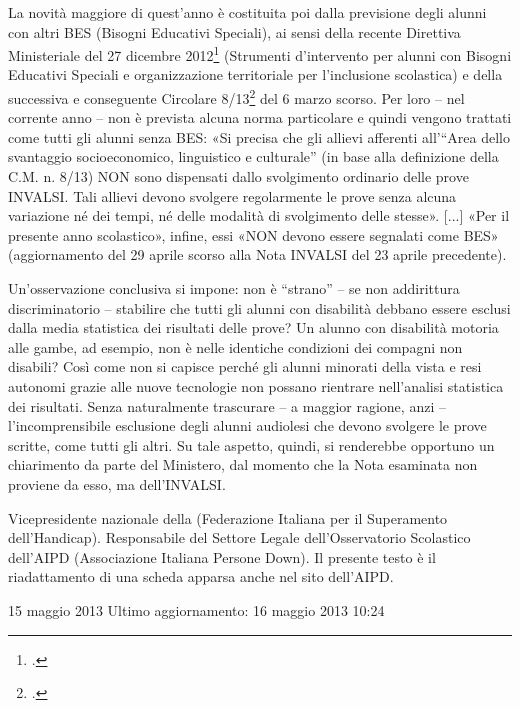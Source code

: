 La novità maggiore di quest'anno è costituita poi dalla previsione degli alunni con altri BES (Bisogni Educativi Speciali), ai sensi della recente Direttiva Ministeriale del 27 dicembre 2012\footcite{dir27Dic2012} (Strumenti d'intervento per alunni con Bisogni Educativi Speciali e organizzazione territoriale per l'inclusione scolastica) e della successiva e conseguente Circolare 8/13\footcite{cm8_2013} del 6 marzo scorso. Per loro – nel corrente anno – non è prevista alcuna norma particolare e quindi vengono trattati come tutti gli alunni senza BES: «Si precisa che gli allievi afferenti all'“Area dello svantaggio socioeconomico, linguistico e culturale” (in base alla definizione della C.M. n. 8/13) NON sono dispensati dallo svolgimento ordinario delle prove INVALSI. Tali allievi devono svolgere regolarmente le prove senza alcuna variazione né dei tempi, né delle modalità di svolgimento delle stesse». [...] «Per il presente anno scolastico», infine, essi «NON devono essere segnalati come BES» (aggiornamento del 29 aprile scorso alla Nota INVALSI del 23 aprile precedente).

Un'osservazione conclusiva si impone: non è “strano” – se non addirittura discriminatorio – stabilire che tutti gli alunni con disabilità debbano essere esclusi dalla media statistica dei risultati delle prove? Un alunno con disabilità motoria alle gambe, ad esempio, non è nelle identiche condizioni dei compagni non disabili? Così come non si capisce perché gli alunni minorati della vista e resi autonomi grazie alle nuove tecnologie non possano rientrare nell'analisi statistica dei risultati. Senza naturalmente trascurare – a maggior ragione, anzi – l'incomprensibile esclusione degli alunni audiolesi che devono svolgere le prove scritte, come tutti gli altri.
Su tale aspetto, quindi, si renderebbe opportuno un chiarimento da parte del Ministero, dal momento che la Nota esaminata non proviene da esso, ma dell'INVALSI.

Vicepresidente nazionale della   (Federazione Italiana per il Superamento dell'Handicap). Responsabile del Settore Legale dell'Osservatorio Scolastico dell'AIPD (Associazione Italiana Persone Down). Il presente testo è il riadattamento di una scheda apparsa anche nel sito dell’AIPD.

15 maggio 2013
Ultimo aggiornamento: 16 maggio 2013 10:24